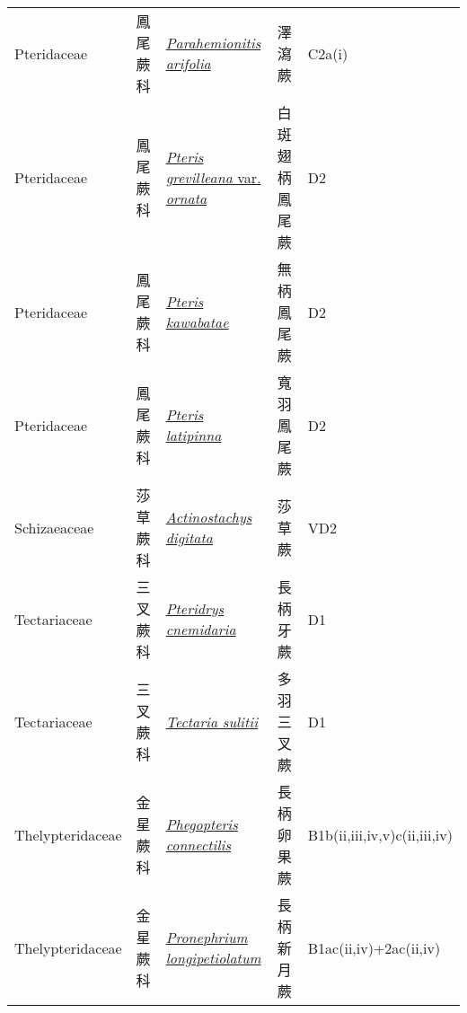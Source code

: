 {\begin{longtable}{L{2.5cm}L{2cm}L{5cm}L{2.5cm}L{3cm}}
    Pteridaceae & 鳳尾蕨科 & \href{http://www.theplantlist.org/tpl1.1/search?q=Parahemionitis+arifolia}{\textit{Parahemionitis arifolia} } & 澤瀉蕨 & C2a(i)    \\
    Pteridaceae & 鳳尾蕨科 & \href{http://www.theplantlist.org/tpl1.1/search?q=Pteris+grevilleana+var.+ornata}{\textit{Pteris grevilleana} var. \textit{ornata} } & 白斑翅柄鳳尾蕨 & D2    \\
    Pteridaceae & 鳳尾蕨科 & \href{http://www.theplantlist.org/tpl1.1/search?q=Pteris+kawabatae}{\textit{Pteris kawabatae} } & 無柄鳳尾蕨 & D2    \\
    Pteridaceae & 鳳尾蕨科 & \href{http://www.theplantlist.org/tpl1.1/search?q=Pteris+latipinna}{\textit{Pteris latipinna} } & 寬羽鳳尾蕨 & D2    \\
    Schizaeaceae & 莎草蕨科 & \href{http://www.theplantlist.org/tpl1.1/search?q=Actinostachys+digitata}{\textit{Actinostachys digitata} } & 莎草蕨 & VD2    \\
    Tectariaceae & 三叉蕨科 & \href{http://www.theplantlist.org/tpl1.1/search?q=Pteridrys+cnemidaria}{\textit{Pteridrys cnemidaria} } & 長柄牙蕨 & D1    \\
    Tectariaceae & 三叉蕨科 & \href{http://www.theplantlist.org/tpl1.1/search?q=Tectaria+sulitii}{\textit{Tectaria sulitii} } & 多羽三叉蕨 & D1    \\
    Thelypteridaceae & 金星蕨科 & \href{http://www.theplantlist.org/tpl1.1/search?q=Phegopteris+connectilis}{\textit{Phegopteris connectilis} } & 長柄卵果蕨 & B1b(ii,iii,iv,v)c(ii,iii,iv)    \\
    Thelypteridaceae & 金星蕨科 & \href{http://www.theplantlist.org/tpl1.1/search?q=Pronephrium+longipetiolatum}{\textit{Pronephrium longipetiolatum} } & 長柄新月蕨 & B1ac(ii,iv)+2ac(ii,iv)    \\

\end{longtable}}
